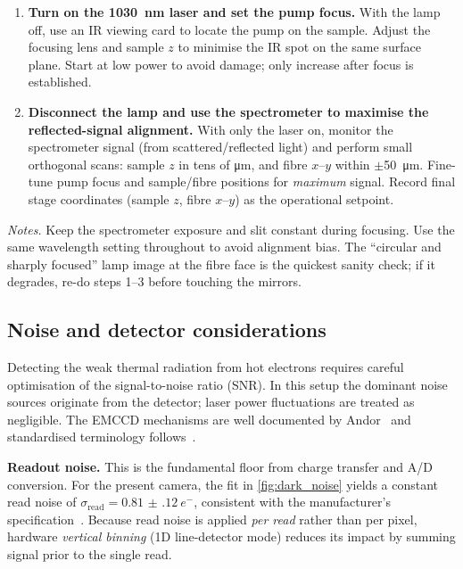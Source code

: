 \documentclass[
	parskip=half,
	a4paper,
]{scrarticle}
\begin{document}
\begin{enumerate}
  \item \textbf{Turn on the \SI{1030}{\nano\metre} laser and set the pump focus.}
  With the lamp off, use an IR viewing card to locate the pump on the sample. Adjust the focusing lens and sample $z$ to minimise the IR spot on the same surface plane. Start at low power to avoid damage; only increase after focus is established.

  \item \textbf{Disconnect the lamp and use the spectrometer to maximise the reflected-signal alignment.}
  With only the laser on, monitor the spectrometer signal (from scattered/reflected light) and perform small orthogonal scans: sample $z$ in tens of \si{\micro\metre}, and fibre $x$–$y$ within \(\pm\)\SI{50}{\micro\metre}. Fine-tune pump focus and sample/fibre positions for \emph{maximum} signal. Record final stage coordinates (sample $z$, fibre $x$–$y$) as the operational setpoint.
\end{enumerate}

\noindent\textit{Notes.}
Keep the spectrometer exposure and slit constant during focusing. Use the same wavelength setting throughout to avoid alignment bias. The “circular and sharply focused” lamp image at the fibre face is the quickest sanity check; if it degrades, re-do steps 1–3 before touching the mirrors.


\subsection{Noise and detector considerations}
Detecting the weak thermal radiation from hot electrons requires careful optimisation of the signal-to-noise ratio (SNR). In this setup the dominant noise sources originate from the detector; laser power fluctuations are treated as negligible. The EMCCD mechanisms are well documented by Andor~\cite{andor_establishing_nodate,dr_jo_walters_sensitivity_2023} and standardised terminology follows~\cite{european_machine_vision_association_standard_2010}.

\textbf{Readout noise.}
This is the fundamental floor from charge transfer and A/D conversion. For the present camera, the fit in \autoref{fig:dark_noise} yields a constant read noise of
\(\sigma_{\text{read}}=\SI{0.81(12)}{e^{-}}\), consistent with the manufacturer’s specification~\cite{andor_ixonem_nodate}.
Because read noise is applied \emph{per read} rather than per pixel, hardware \emph{vertical binning} (1D line-detector mode) reduces its impact by summing signal prior to the single read.
\end{document}
